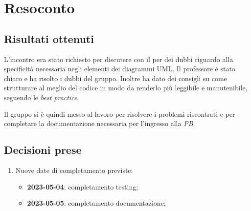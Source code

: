 \section{Resoconto}

\subsection{Risultati ottenuti}

L'incontro era stato richiesto per discutere con il \Cardin per dei dubbi riguardo alla specificità necessaria negli elementi dei diagrammi UML. Il professore è stato chiaro e ha risolto i dubbi del gruppo. Inoltre ha dato dei consigli su come strutturare al meglio del codice in modo da renderlo più leggibile e manutenibile, seguendo le \textit{best practice}.

Il gruppo si è quindi messo al lavoro per risolvere i problemi riscontrati e per completare la documentazione necessaria per l'ingresso alla \textit{PB}.
\subsection{Decisioni prese}

\begin{enumerate}

    \item Nuove date di completamento previste:
    \begin{itemize}
        \item \textbf{2023-05-04}: completamento testing;
        \item \textbf{2023-05-05}: completamento documentazione;
    \end{itemize}

\end{enumerate}
